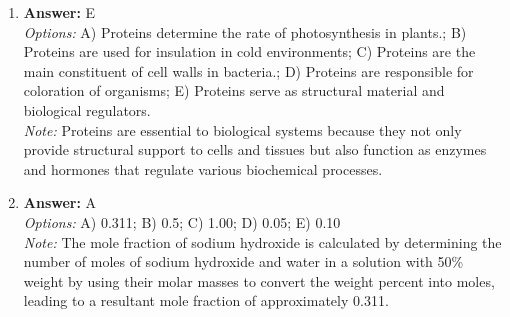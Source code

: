 \documentclass[12pt]{article}
\begin{document}
\begin{enumerate}[label=\arabic*.]
\item \textbf{Answer:} E
\\ \textit{Options:} A) Proteins determine the rate of photosynthesis in plants.; B) Proteins are used for insulation in cold environments; C) Proteins are the main constituent of cell walls in bacteria.; D) Proteins are responsible for coloration of organisms; E) Proteins serve as structural material and biological regulators.
\\ \textit{Note:} Proteins are essential to biological systems because they not only provide structural support to cells and tissues but also function as enzymes and hormones that regulate various biochemical processes.
\item \textbf{Answer:} A
\\ \textit{Options:} A) 0.311; B) 0.5; C) 1.00; D) 0.05; E) 0.10
\\ \textit{Note:} The mole fraction of sodium hydroxide is calculated by determining the number of moles of sodium hydroxide and water in a solution with 50\% weight by using their molar masses to convert the weight percent into moles, leading to a resultant mole fraction of approximately 0.311.
\end{enumerate}
\end{document}
